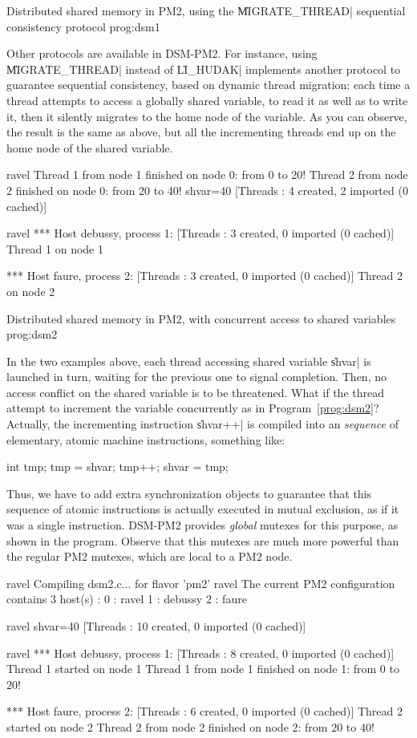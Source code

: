  {Distributed shared memory in PM2, using
  the \|MIGRATE_THREAD| sequential consistency protocol}
{prog:dsm1}

Other protocols are available in DSM-PM2. For instance, using
\|MIGRATE_THREAD| instead of \|LI_HUDAK| implements another protocol
to guarantee sequential consistency, based on dynamic thread migration:
each time a thread attempts to access a globally shared variable, to
read it as well as to write it, then it silently migrates to the home
node of the variable. As you can observe, the result is the same as
above, but all the incrementing threads end up on the home node of
the shared variable.
\begin{shell}
ravel%
Thread 1 from node 1 finished on node 0: from 0 to 20!
Thread 2 from node 2 finished on node 0: from 20 to 40!
shvar=40
[Threads : 4 created, 2 imported (0 cached)]

ravel%
*** Host debussy, process 1:
[Threads : 3 created, 0 imported (0 cached)]
Thread 1 on node 1

*** Host faure, process 2:
[Threads : 3 created, 0 imported (0 cached)]
Thread 2 on node 2
\end{shell}


 {Distributed shared memory in PM2, with
  concurrent access to shared variables} {prog:dsm2}

In the two examples above, each thread accessing shared variable
\|shvar| is launched in turn, waiting for the previous one to signal
completion. Then, no access conflict on the shared variable is to be
threatened. What if the thread attempt to increment the variable
concurrently as in Program~\ref{prog:dsm2}? Actually, the
incrementing instruction \|shvar++| is compiled into an
\emph{sequence} of elementary, atomic machine instructions, something
like:
\begin{program}
{int tmp; tmp = shvar; tmp++; shvar = tmp;}
\end{program}
Thus, we have to add extra synchronization objects to guarantee that
this sequence of atomic instructions is actually executed in mutual
exclusion, as if it was a single instruction. DSM-PM2 provides
\emph{global} mutexes for this purpose, as shown in the program.
Observe that this mutexes are much more powerful than the regular PM2
mutexes, which are local to a PM2 node.
\begin{shell}
ravel%
Compiling dsm2.c... for flavor 'pm2'
ravel%
The current PM2 configuration contains 3 host(s) :
0 : ravel
1 : debussy
2 : faure

ravel%
shvar=40
[Threads : 10 created, 0 imported (0 cached)]

ravel%
*** Host debussy, process 1:
[Threads : 8 created, 0 imported (0 cached)]
Thread 1 started on node 1
Thread 1 from node 1 finished on node 1: from 0 to 20!

*** Host faure, process 2:
[Threads : 6 created, 0 imported (0 cached)]
Thread 2 started on node 2
Thread 2 from node 2 finished on node 2: from 20 to 40!
\end{shell}

